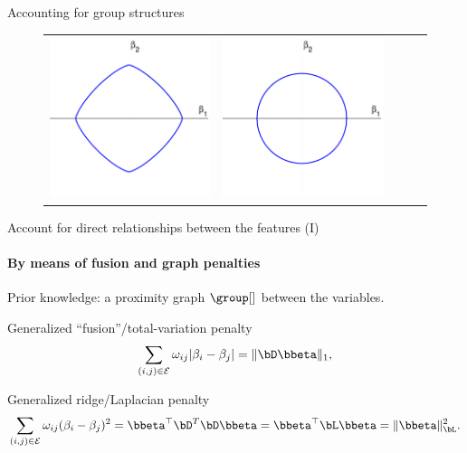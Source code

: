 \documentclass{beamer}\usepackage[]{graphicx}\usepackage[]{color}
\begin{document}
\begin{frame}{Accounting for group structures}
\begin{figure}[htbp!]
\begin{tabular}{@{}ccccc@{}}
      \includegraphics[width=.175\textwidth]{figures/norms_marie/hierarchical2D} & 
      \includegraphics[width=.175\textwidth]{figures/norms_marie/grouplasso2D} \\
    \end{tabular}
  \end{figure}

\end{frame}

\begin{frame}{Account for direct relationships between the features (I)}
  \framesubtitle{By means of fusion and graph penalties}
  
  \begin{block}{Prior knowledge: a proximity graph $\group[]$ between the variables.}
  \end{block}

  \begin{block}{Generalized ``fusion''/total-variation penalty}
    \begin{equation*}
      \sum_{(i,j)\in\mathcal{E}}     \omega_{ij}
      |\beta_i - \beta_j | = \| \bD \bbeta\|_1,
    \end{equation*}
  \end{block}

  \begin{block}{Generalized ridge/Laplacian penalty}
    \begin{equation*}
      \sum_{(i,j)\in\mathcal{E}} \omega_{ij} (\beta_i - \beta_j)^2 =
      \bbeta^\top   \bD^T  \bD   \bbeta   =  \bbeta^\top   \bL  \bbeta   =
      \|\bbeta\|_\bL^2.
    \end{equation*}
  \end{block}
    
\end{frame}
\end{document}
